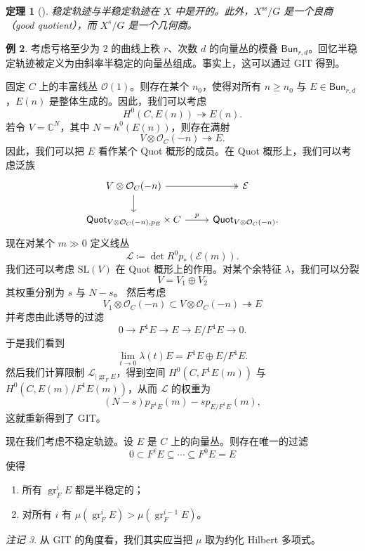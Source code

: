\documentclass{amsart}
\newtheorem{thm}{定理}[section]
\theoremstyle{definition}
\newtheorem{exm}[thm]{例}
\theoremstyle{remark}
\newtheorem{rmk}[thm]{注记}
\theoremstyle{plain}
\theoremstyle{definition}
\theoremstyle{remark}
\newcommand{\C}{\mathbb{C}}
\newcommand{\mc}[1]{\mathcal{#1}}
\newcommand{\mr}[1]{\mathrm{#1}}
\newcommand{\on}[1]{\operatorname{#1}}
\newcommand{\ms}[1]{\mathsf{#1}}
\newcommand{\1}{\mathbf{1}}
\newcommand{\2}{\mathbf{2}}
\newcommand{\3}{\mathbf{3}}
\begin{document}
\begin{thm}[{\cite{MFK1994}}]
    稳定轨迹与半稳定轨迹在 \(X\) 中是开的。此外，\(X^{\on{ss}}/G\) 是一个良商（good quotient），而 \(X^s/G\) 是一个几何商。  
\end{thm}

\begin{exm}
    考虑亏格至少为 \(2\) 的曲线上秩 \(r\)、次数 \(d\) 的向量丛的模叠 \(\ms{Bun}_{r,d}\)。回忆半稳定轨迹被定义为由斜率半稳定的向量丛组成。事实上，这可以通过 GIT 得到。

    固定 \(C\) 上的丰富线丛 \(\mc{O}(1)\)。则存在某个 \(n_0\)，使得对所有 \(n \geq n_0\) 与 \(E \in \ms{Bun}_{r,d}\)，\(E(n)\) 是整体生成的。因此，我们可以考虑
    \[ H^0(C, E(n)) \twoheadrightarrow E(n). \]
    若令 \(V = \C^N\)，其中 \(N = h^0(E(n))\)，则存在满射
    \[ V \otimes \mc{O}_C(-n) \twoheadrightarrow E. \]
    因此，我们可以把 \(E\) 看作某个 Quot 概形的成员。在 Quot 概形上，我们可以考虑泛族
    \begin{equation*}
    \begin{tikzcd}
        V \otimes \mc{O}_C(-n) \ar[twoheadrightarrow]{r} \ar{d} & \mc{E} \\
        \ms{Quot}_{V \otimes \mc{O}_C(-n), p_E} \times C \ar{r}{p} & \ms{Quot}_{V \otimes \mc{O}_C(-n)}.
    \end{tikzcd}
    \end{equation*}
    现在对某个 \(m \gg 0\) 定义线丛
    \[ \mc{L} \coloneqq \det R^0 p_* (\mc{E}(m)). \]
    我们还可以考虑 \(\mr{SL}(V)\) 在 Quot 概形上的作用。对某个余特征 \(\lambda\)，我们可以分裂
    \[ V = V_1 \oplus V_2 \]
    其权重分别为 \(s\) 与 \(N-s\)。
    然后考虑
    \[ V_1 \otimes \mc{O}_C(-n) \subset V \otimes \mc{O}_C(-n) \twoheadrightarrow E \]
    并考虑由此诱导的过滤
    \[ 0 \to F^1 E \to E \to E / F^1 E \to 0. \]
    于是我们看到
    \[ \lim_{t \to 0} \lambda(t) E = F^1 E \oplus E/F^1 E. \]
    然后我们计算限制 \(\mc{L}_{|\on{gr}_F E}\)，得到空间 \(H^0(C, F^1 E(m))\) 与 \(H^0(C, E(m)/F^1 E(m))\)，从而 \(\mc{L}\) 的权重为
    \[ (N-s) p_{F^1 E}(m) - s p_{E/F^1 E}(m), \]
    这就重新得到了 GIT。
\end{exm}

现在我们考虑不稳定轨迹。设 \(E\) 是 \(C\) 上的向量丛。则存在唯一的过滤
\[ 0 \subset F^{\ell} E \subseteq \cdots \subseteq F^0 E = E \]
使得
\begin{enumerate}
    \item 所有 \(\on{gr}_F^i E\) 都是半稳定的；
    \item 对所有 \(i\) 有 \(\mu(\on{gr}_F^i E) > \mu(\on{gr}_F^{i-1} E)\)。
\end{enumerate}
\begin{rmk}
    从 GIT 的角度看，我们其实应当把 \(\mu\) 取为约化 Hilbert 多项式。
\end{rmk}
\end{document}
